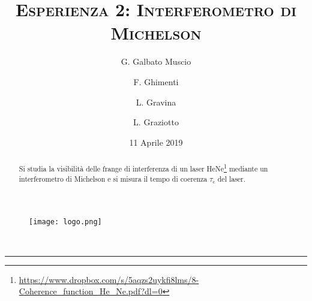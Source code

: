 \documentclass[10pt,oneside,a4paper]{article}
\title{\textsc{\textbf{Esperienza 2}: Interferometro di Michelson}}
\author{\small{G. Galbato Muscio} \and \small{F. Ghimenti} \and \small{L. Gravina} \and \small{L. Graziotto}}
\date{11 Aprile 2019}
\begin{document}
	\begin{figure}
		\centering
		\texttt{[image: logo.png]}
	\end{figure}
	\maketitle
	\begin{center} 
		 \\
	\end{center}
\hrule
\vfill
\renewcommand{\abstractname}{Abstract}
\begin{abstract}
Si studia la visibilità delle frange di interferenza di un laser HeNe\footnote{\url{https://www.dropbox.com/s/5aqzs2uykfi8lms/8-Coherence_function_He_Ne.pdf?dl=0}} mediante un interferometro di Michelson e si misura il tempo di coerenza $\tau_\mathrm{c}$ del laser.
\end{abstract}
\vfill
\tableofcontents %
\newpage


\pagebreak
\end{document}
